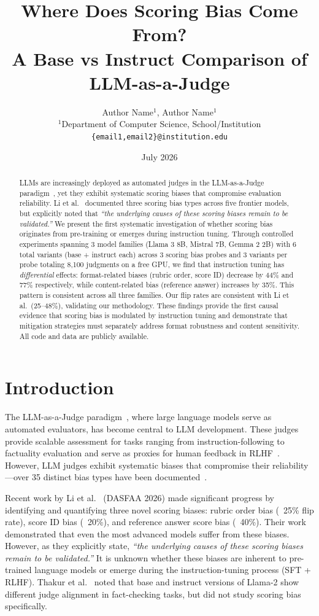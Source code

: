 \documentclass[11pt,twocolumn]{article}
\title{Where Does Scoring Bias Come From?\\A Base vs Instruct Comparison of LLM-as-a-Judge}
\author{Author Name$^{1}$, Author Name$^{1}$ \\
$^{1}$Department of Computer Science, School/Institution \\
\texttt{\{email1,email2\}@institution.edu}}
\date{July 2026}
\begin{document}
\maketitle

\begin{abstract}
LLMs are increasingly deployed as automated judges in the LLM-as-a-Judge paradigm~\cite{zheng2023judging}, yet they exhibit systematic scoring biases that compromise evaluation reliability. Li et al.~\cite{li2025scoring} documented three scoring bias types across five frontier models, but explicitly noted that \emph{``the underlying causes of these scoring biases remain to be validated.''} We present the first systematic investigation of whether scoring bias originates from pre-training or emerges during instruction tuning. Through controlled experiments spanning 3 model families (Llama 3 8B, Mistral 7B, Gemma 2 2B) with 6 total variants (base + instruct each) across 3 scoring bias probes and 3 variants per probe totaling 8,100 judgments on a free GPU, we find that instruction tuning has \emph{differential} effects: format-related biases (rubric order, score ID) decrease by 44\% and 77\% respectively, while content-related bias (reference answer) increases by 35\%. This pattern is consistent across all three families. Our flip rates are consistent with Li et al.~(25--48\%), validating our methodology. These findings provide the first causal evidence that scoring bias is modulated by instruction tuning and demonstrate that mitigation strategies must separately address format robustness and content sensitivity. All code and data are publicly available.
\end{abstract}

\section{Introduction}

The LLM-as-a-Judge paradigm~\cite{zheng2023judging,gu2024survey}, where large language models serve as automated evaluators, has become central to LLM development. These judges provide scalable assessment for tasks ranging from instruction-following to factuality evaluation and serve as proxies for human feedback in RLHF~\cite{bai2022constitutional}. However, LLM judges exhibit systematic biases that compromise their reliability---over 35 distinct bias types have been documented~\cite{ye2024justice,chen2024humans}.

Recent work by Li et al.~\cite{li2025scoring} (DASFAA 2026) made significant progress by identifying and quantifying three novel scoring biases: rubric order bias (~25\% flip rate), score ID bias (~20\%), and reference answer score bias (~40\%). Their work demonstrated that even the most advanced models suffer from these biases. However, as they explicitly state, \emph{``the underlying causes of these scoring biases remain to be validated.''} It is unknown whether these biases are inherent to pre-trained language models or emerge during the instruction-tuning process (SFT + RLHF). Thakur et al.~\cite{thakur2024judging} noted that base and instruct versions of Llama-2 show different judge alignment in fact-checking tasks, but did not study scoring bias specifically.
\end{document}

